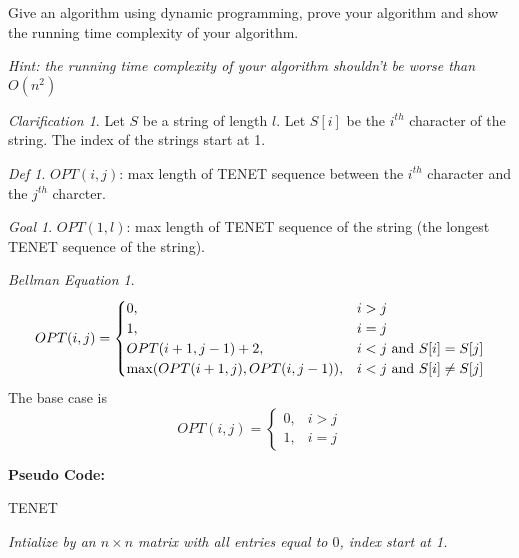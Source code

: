 \documentclass[10.5pt]{article}
\newenvironment{main idea}{\textbf{Main Idea: }}{}
\newenvironment{pseudo}{\textbf{Pseudo Code: }\\}{}
\theoremstyle{remark}
\newtheorem*{define}{Def}
\newtheorem*{goal}{Goal}
\newtheorem*{clarification}{Clarification}
\newtheorem*{bellman}{Bellman Equation}
\begin{document}
Give an algorithm using dynamic programming, prove your algorithm and  show the running time complexity of your algorithm.

\textit{Hint: the running time complexity of your algorithm shouldn't be worse than $O(n^{2})$}\\
\begin{main idea}
\begin{clarification}
	Let \(S\) be a string of length \(l\).
	Let \(S[i]\) be the \(i^{th}\) character of the string. The index of the strings start at 1.
\end{clarification}
\begin{define}
	\(OPT(i, j)\): max length of TENET sequence between the \(i^{th}\) character and the \(j^{th}\) charcter.
\end{define}
\begin{goal}
	\(OPT(1, l)\): max length of TENET sequence of the string (the longest TENET sequence of the string).
\end{goal}
\begin{bellman}
	\[
		OPT(i, j) =
		\begin{cases}
			0,                                  & i > j                               \\
			1,                                  & i = j                               \\
			OPT(i + 1, j - 1) + 2,              & i < j \textup{ and } S[i] = S[j]    \\
			\max(OPT(i + 1, j), OPT(i, j - 1)), & i < j \textup{ and } S[i] \neq S[j]
		\end{cases}
	\]
	The base case is
	\[
		OPT(i, j) =
		\begin{cases}
			0, & i > j \\
			1, & i = j
		\end{cases}
	\]
\end{bellman}
\end{main idea}
\begin{pseudo}
	\begin{algorithm}[H]
		\DontPrintSemicolon
		\caption{TENET}


		\BlankLine
		\emph{Intialize \OPT by an \(n \times n\) matrix with all entries equal to \(0\), index start at 1.}\;
		\Return{\(\OPT[1][l]\)}
	\end{algorithm}
\end{pseudo}
\end{document}
